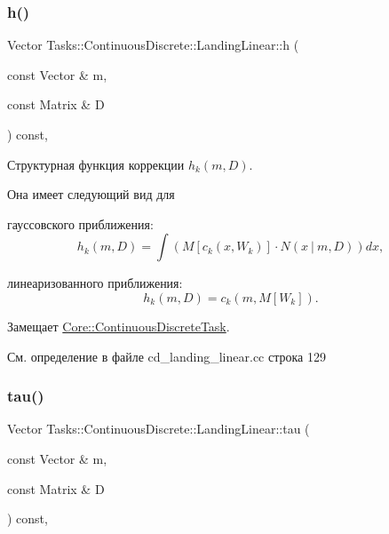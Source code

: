 \subsubsection{\texorpdfstring{h()}{h()}}
{\footnotesize\ttfamily Vector Tasks\+::\+Continuous\+Discrete\+::\+Landing\+Linear\+::h (\begin{DoxyParamCaption}\item[{const Vector \&}]{m,  }\item[{const Matrix \&}]{D }\end{DoxyParamCaption}) const\hspace{0.3cm}{\ttfamily [override]}, {\ttfamily [virtual]}}



Структурная функция коррекции $h_k(m, D)$. 

Она имеет следующий вид для


\begin{DoxyItemize}
\item гауссовского приближения\+: \[h_k(m, D) = \int (M[c_k(x, W_k)] \cdot N(x\ |\ m, D))dx,\]
\item линеаризованного приближения\+: \[h_k(m, D) = c_k(m, M[W_k]).\] 
\end{DoxyItemize}

Замещает \hyperlink{class_core_1_1_continuous_discrete_task_a25e88b71eb477d99bad66a66c982af6f}{Core\+::\+Continuous\+Discrete\+Task}.



См. определение в файле cd\+\_\+landing\+\_\+linear.\+cc строка 129

\hypertarget{class_tasks_1_1_continuous_discrete_1_1_landing_linear_a1ee11cced65180b2a055b8ca848ef4e0}{}\label{class_tasks_1_1_continuous_discrete_1_1_landing_linear_a1ee11cced65180b2a055b8ca848ef4e0} 
\subsubsection{\texorpdfstring{tau()}{tau()}}
{\footnotesize\ttfamily Vector Tasks\+::\+Continuous\+Discrete\+::\+Landing\+Linear\+::tau (\begin{DoxyParamCaption}\item[{const Vector \&}]{m,  }\item[{const Matrix \&}]{D }\end{DoxyParamCaption}) const\hspace{0.3cm}{\ttfamily [override]}, {\ttfamily [virtual]}}



